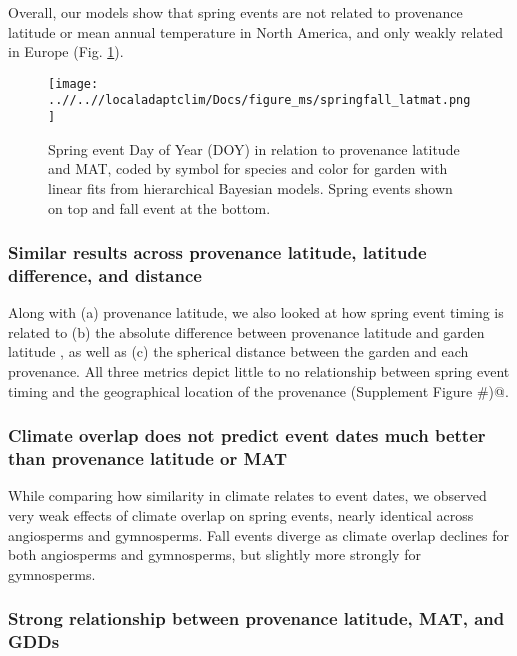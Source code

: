 \documentclass{article}
\begin{document}
Overall, our models show that spring events are not related to provenance latitude or mean annual temperature in North America, and only weakly related in Europe (Fig. \ref{figure:springfall_latmat}). 


\begin{figure}[!h] 
    \centering
 \texttt{[image: ..//..//localadaptclim/Docs/figure\_ms/springfall\_latmat.png]}
    \caption{Spring event Day of Year (DOY) in relation to provenance latitude and MAT, coded by symbol for species and color for garden with linear fits from hierarchical Bayesian models. Spring events shown on top and fall event at the bottom.}
    \label{figure:springfall_latmat}
\end{figure}


\newpage

\subsubsection {Similar results across provenance latitude, latitude difference, and distance}
Along with (a) provenance latitude, we also looked at how spring event timing is related to (b) the absolute difference between provenance latitude and garden latitude , as well as (c) the spherical distance between the garden and each provenance. All three metrics depict little to no relationship between spring event timing and the geographical location of the provenance \verb@(Supplement Figure #)@.

\subsubsection {Climate overlap does not predict event dates much better than provenance latitude or MAT}

While comparing how similarity in climate relates to event dates, we observed very weak effects of climate overlap on spring events, nearly identical across angiosperms and gymnosperms. Fall events diverge as climate overlap declines for both angiosperms and gymnosperms, but slightly more strongly for gymnosperms.

\subsubsection {Strong relationship between provenance latitude, MAT, and GDDs}
\end{document}
